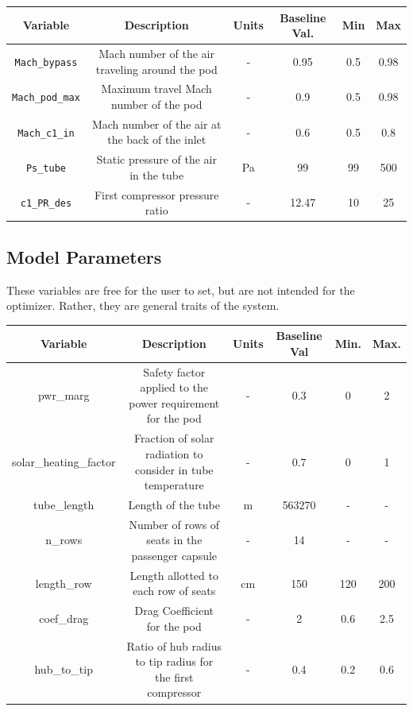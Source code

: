 \documentclass[heading.tex]{subfiles}
\begin{document}
\begin{adjustwidth}{-2cm}{-2cm}
\begin{tabular}{|c|c|c|c|c|c|}
\hline 
Variable & Description & Units & Baseline Val. & Min & Max \\ 
\hline 
\texttt{Mach\_bypass} & Mach number of the air traveling around the pod & - & 0.95 & 0.5 & 0.98 \\ 
\hline 
\texttt{Mach\_pod\_max} & Maximum travel Mach number of the pod & - & 0.9 & 0.5 & 0.98 \\ 
\hline 
\texttt{Mach\_c1\_in} & Mach number of the air at the back of the inlet & - & 0.6 & 0.5 & 0.8 \\ 
\hline 
\texttt{Ps\_tube} & Static pressure of the air in the tube & Pa & 99 & 99 & 500 \\ 
\hline 
\texttt{c1\_PR\_des} & First compressor pressure ratio & - & 12.47 & 10 & 25 \\ 
\hline 
\end{tabular} 
\end{adjustwidth}

\subsection{Model Parameters}
These variables are free for the user to set, but are not intended for the optimizer. Rather, they are general traits of the system.

\begin{adjustwidth}{-3cm}{-3cm}
\begin{tabular}{|c|c|c|c|c|c|}
\hline 
Variable & Description & Units & Baseline Val & Min. & Max. \\ 
\hline 
pwr\_marg & Safety factor applied to the power requirement for the pod & - & 0.3 & 0 & 2 \\ 
\hline 
solar\_heating\_factor & Fraction of solar radiation to consider in tube temperature & - & 0.7 & 0 & 1 \\ 
\hline 
tube\_length & Length of the tube & m & 563270 & - & - \\ 
\hline 
n\_rows & Number of rows of seats in the passenger capsule & - & 14 & - & - \\ 
\hline 
length\_row & Length allotted to each row of seats & cm & 150 & 120 & 200 \\ 
\hline 
coef\_drag & Drag Coefficient for the pod & - & 2 & 0.6 & 2.5 \\ 
\hline 
hub\_to\_tip & Ratio of hub radius to tip radius for the first compressor & - & 0.4 & 0.2 & 0.6 \\ 
\hline 
\end{tabular} 
\end{adjustwidth}
\end{document}
